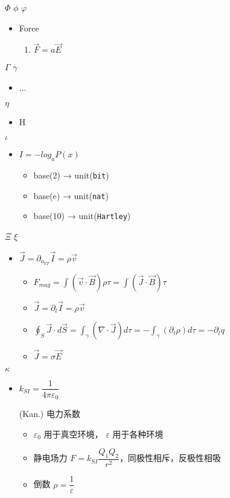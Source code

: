 $\Phi$ $\phi$ $\varphi$
\begin{itemize}
	\item Force
	\begin{enumerate}
		\item $\vec F = a \vec E$ %
	\end{enumerate}
\end{itemize}

 $\Gamma$ $\gamma$\begin{itemize}
	\item ...
\end{itemize}

 $\eta$\begin{itemize}
	\item H %
\end{itemize}

 $\iota$\begin{itemize}
	\item $I = - log_a P(x)$ %
	\begin{itemize}
		\item base(2) → unit(\verb`bit`)
		\item base(e) → unit(\verb`nat`)
		\item base(10) → unit(\verb`Hartley`)
	\end{itemize}
\end{itemize}

 $\Xi$ $\xi$\begin{itemize}
	\item $\vec{J} = \partial_{a_{VT}}\vec{I} = \rho\vec{v}$ %
	\begin{itemize}
		\item $F_{mag} = \int(\vec{v}\cdot\vec{B})\rho\tau = \int(\vec{J}\cdot\vec{B})\tau$
		\item $\vec{J} = \partial_{l}\vec{I} = \rho\vec{v}$%
		\item $\oint_S \vec{J}\cdot d\vec{S} = \int_\gamma(\nabla \cdot \vec{J})d\tau = -\int_\gamma(\partial_t\rho)d\tau = -\partial_t q$%
		\item $\vec{J} = \sigma \vec{E}$ %
	\end{itemize}
\end{itemize}

 $\kappa$ \begin{itemize}
\item $k_{SI} = \dfrac {1}{4 \pi \varepsilon_0}$ 

(Kan.) 电力系数%
	
\begin{itemize}
	\item  $\varepsilon_0$ 用于真空环境， $\varepsilon$ 用于各种环境
	\item  静电场力 $F = k_{SI} \dfrac{Q_1 Q_2}{r^2}$，同极性相斥，反极性相吸
	\item  倒数 $\rho = \dfrac 1 \varepsilon$ 
\end{itemize}
	
	
\end{itemize}

